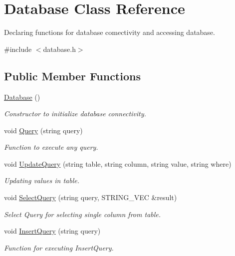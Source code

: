 \hypertarget{classDatabase}{\section{Database Class Reference}
\label{classDatabase}
}


Declaring functions for database comectivity and accessing database.  




{\ttfamily \#include $<$database.\-h$>$}

\subsection*{Public Member Functions}
\begin{DoxyCompactItemize}
\item 
\hyperlink{classDatabase_a4703c80e6969d33565ea340f768fdadf}{Database} ()
\begin{DoxyCompactList}\small\item\em Constructor to initialize database connectivity. \end{DoxyCompactList}\item 
void \hyperlink{classDatabase_ab790a68bd8fdbd36133d56ca21ec45d0}{Query} (string query)
\begin{DoxyCompactList}\small\item\em Function to execute any query. \end{DoxyCompactList}\item 
void \hyperlink{classDatabase_adab1d6cc97c8b14e9d170d5659a92d3e}{Update\-Query} (string table, string column, string value, string where)
\begin{DoxyCompactList}\small\item\em Updating values in table. \end{DoxyCompactList}\item 
void \hyperlink{classDatabase_a4ccf07a8481a83055d8ce5fd27f0b415}{Select\-Query} (string query, S\-T\-R\-I\-N\-G\-\_\-\-V\-E\-C \&result)
\begin{DoxyCompactList}\small\item\em Select Query for selecting single column from table. \end{DoxyCompactList}\item 
void \hyperlink{classDatabase_a63d8c1af7507b1dcdc81a411f9a0b4b4}{Insert\-Query} (string query)
\begin{DoxyCompactList}\small\item\em Function for executing Insert\-Query. \end{DoxyCompactList}\item 

\end{DoxyCompactItemize}
